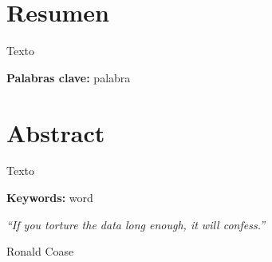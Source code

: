 \documentclass[a4paper, 11pt, twoside]{Thesis}  %
\begin{document}

\chapter{Resumen}
\bigskip
Texto

\textbf{Palabras clave:} palabra
\cleardoublepage  %

\chapter{Abstract}
\bigskip
Texto

\textbf{Keywords:} word
\cleardoublepage  %


\fancyhead{}  %
\rhead{\thepage}  %
\lhead{}  %
\pagestyle{empty}  %

\cleardoublepage  %

\pagestyle{empty}  %
\null\vfill\begin{flushright}
\textit{``If you torture the data long enough, it will confess.''}

Ronald Coase
\end{flushright}
\vfill\vfill\vfill\vfill\vfill\vfill\null
\cleardoublepage  %


\pagestyle{fancy}  %
\end{document}

